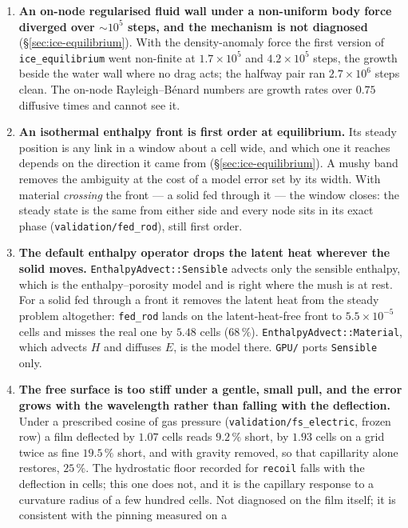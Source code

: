 \documentclass[11pt,a4paper]{article}
\newcommand{\code}[1]{\texttt{\small #1}}
\begin{document}
\begin{enumerate}[leftmargin=1.4em,itemsep=4pt]
\item \textbf{An on-node regularised fluid wall under a non-uniform body force
  diverged over $\sim10^5$ steps, and the mechanism is not diagnosed}
  (\S\ref{sec:ice-equilibrium}). With the density-anomaly force the first
  version of \code{ice\_equilibrium} went non-finite at $1.7\times10^5$ and
  $4.2\times10^5$ steps, the growth beside the water wall where no drag acts;
  the halfway pair ran $2.7\times10^6$ steps clean. The on-node Rayleigh--B\'enard
  numbers are growth rates over $0.75$ diffusive times and cannot see it.
\item \textbf{An isothermal enthalpy front is first order at equilibrium.}
  Its steady position is any link in a window about a cell wide, and which one it
  reaches depends on the direction it came from (\S\ref{sec:ice-equilibrium}).
  A mushy band removes the ambiguity at the cost of a model error set by its
  width. With material \emph{crossing} the front --- a solid fed through it ---
  the window closes: the steady state is the same from either side and every
  node sits in its exact phase (\code{validation/fed\_rod}), still first order.
\item \textbf{The default enthalpy operator drops the latent heat wherever the
  solid moves.} \code{EnthalpyAdvect::Sensible} advects only the sensible
  enthalpy, which is the enthalpy--porosity model and is right where the mush is
  at rest. For a solid fed through a front it removes the latent heat from the
  steady problem altogether: \code{fed\_rod} lands on the latent-heat-free front
  to $5.5\times10^{-5}$ cells and misses the real one by $5.48$ cells ($68\,\%$).
  \code{EnthalpyAdvect::Material}, which advects $H$ and diffuses $E$, is the
  model there. \code{GPU/} ports \code{Sensible} only.
\item \textbf{The free surface is too stiff under a gentle, small pull, and the
  error grows with the wavelength rather than falling with the deflection.}
  Under a prescribed cosine of gas pressure (\code{validation/fs\_electric},
  frozen row) a film deflected by $1.07$ cells reads $9.2\,\%$ short, by $1.93$
  cells on a grid twice as fine $19.5\,\%$ short, and with gravity removed, so
  that capillarity alone restores, $25\,\%$. The hydrostatic floor recorded for
  \code{recoil} falls with the deflection in cells; this one does not, and it
  is the capillary response to a curvature radius of a few hundred cells. Not
  diagnosed on the film itself; it is consistent with the pinning measured on a

\end{enumerate}
\end{document}
